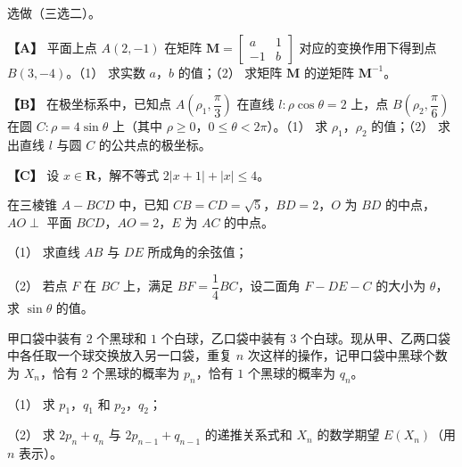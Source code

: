 \begin{question}
选做（三选二）。

\textbf{【A】} 平面上点 $A(2,-1)$ 在矩阵 $\boldsymbol M=\begin{bmatrix}a&1\\-1&b\end{bmatrix}$ 对应的变换作用下得到点 $B(3,-4)$。（1） 求实数 $a$，$b$ 的值；（2） 求矩阵 $\boldsymbol M$ 的逆矩阵 $\boldsymbol M^{-1}$。

\textbf{【B】} 在极坐标系中，已知点 $A\left(\rho_1,\dfrac\pi3\right)$ 在直线 $l:\rho\cos\theta=2$ 上，点 $B\left(\rho_2,\dfrac\pi6\right)$ 在圆 $C:\rho=4\sin\theta$ 上（其中 $\rho\geqslant0$，$0\leqslant\theta<2\pi$）。（1） 求 $\rho_1$，$\rho_2$ 的值；（2） 求出直线 $l$ 与圆 $C$ 的公共点的极坐标。

\textbf{【C】} 设 $x\in\mathbf R$，解不等式 $2|x+1|+|x|\leqslant4$。

\Needspace{0.4\textheight}
\end{question}
\begin{question}
在三棱锥 $A-BCD$ 中，已知 $CB=CD=\sqrt5$，$BD=2$，$O$ 为 $BD$ 的中点，$AO\perp$ 平面 $BCD$，$AO=2$，$E$ 为 $AC$ 的中点。

（1） 求直线 $AB$ 与 $DE$ 所成角的余弦值；

（2） 若点 $F$ 在 $BC$ 上，满足 $BF=\dfrac14BC$，设二面角 $F-DE-C$ 的大小为 $\theta$，求 $\sin\theta$ 的值。
\nopagebreak[4]
\begin{center}\end{center}
\nopagebreak[4]
\end{question}
\begin{question}
甲口袋中装有 $2$ 个黑球和 $1$ 个白球，乙口袋中装有 $3$ 个白球。现从甲、乙两口袋中各任取一个球交换放入另一口袋，重复 $n$ 次这样的操作，记甲口袋中黑球个数为 $X_n$，恰有 $2$ 个黑球的概率为 $p_n$，恰有 $1$ 个黑球的概率为 $q_n$。

（1） 求 $p_1$，$q_1$ 和 $p_2$，$q_2$；

（2） 求 $2p_n+q_n$ 与 $2p_{n-1}+q_{n-1}$ 的递推关系式和 $X_n$ 的数学期望 $E(X_n)$（用 $n$ 表示）。

\end{question}
